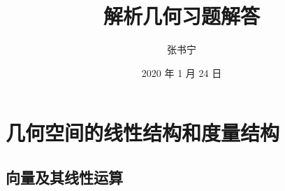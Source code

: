\documentclass[a4paper, 11pt]{ctexbook}
\title{解析几何习题解答}
\author{张书宁}
\date{2020 年 1 月 24 日}
\begin{document}
    \chapter{几何空间的线性结构和度量结构}
        \section{向量及其线性运算}
\end{document}
